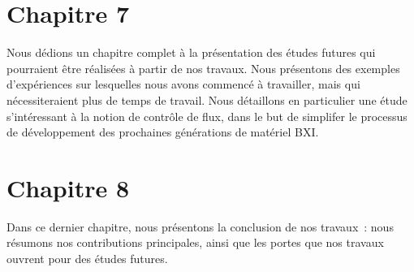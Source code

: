 \section*{Chapitre 7}

Nous dédions un chapitre complet à la présentation des études futures qui
pourraient être réalisées à partir de nos travaux. Nous présentons des exemples
d'expériences sur lesquelles nous avons commencé à travailler, mais qui
nécessiteraient plus de temps de travail. Nous détaillons en particulier une
étude s'intéressant à la notion de contrôle de flux, dans le but de simplifer le
processus de développement des prochaines générations de matériel BXI.

\section*{Chapitre 8}

Dans ce dernier chapitre, nous présentons la conclusion de nos travaux~: nous
résumons nos contributions principales, ainsi que les portes que nos travaux
ouvrent pour des études futures.